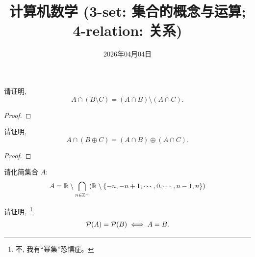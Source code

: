 \documentclass[a4paper, justified]{tufte-handout}
\title{计算机数学 (3-set: 集合的概念与运算; 4-relation: 关系)}
\date{2026年04月04日}
\begin{document}
\maketitle
\noplagiarism %
\begin{abstract}
\end{abstract}
\beginrequired

\begin{problem}[相对补与绝对补]
  请证明,
  \[
    A \cap (B \setminus C) = (A \cap B) \setminus (A \cap C).
  \]
\end{problem}

\begin{proof}
\end{proof}

\begin{problem}[对称差]
  请证明,
  \[
    A \cap (B \oplus C) = (A \cap B) \oplus (A \cap C).
  \]
\end{problem}

\begin{proof}
\end{proof}

\begin{problem}
  请化简集合 $A$:
  \[
    A = \mathbb{R} \setminus \bigcap_{n \in \mathbb{Z}^{+}} (\mathbb{R} \setminus \{-n, -n+1, \cdots, 0, \cdots, n-1, n\})
  \]
\end{problem}

\begin{solution}
\end{solution}

\begin{problem}[幂集]
  请证明,~\footnote{不, 我有``幂集''恐惧症。}
  \[
    \mathcal{P}(A) = \mathcal{P}(B) \iff A = B.
  \]
\end{problem}

\begin{solution}
\end{solution}
\end{document}
